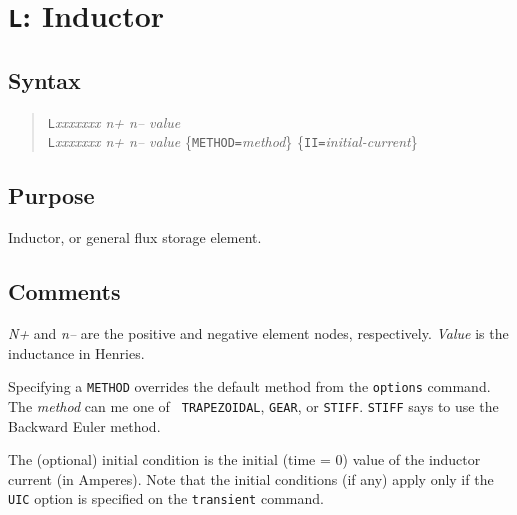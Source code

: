 \section{{\tt L}: Inductor}
\subsection{Syntax}
\begin{verse}
{\tt L}{\it xxxxxxx n+ n-- value}\\
{\tt L}{\it xxxxxxx n+ n-- value} \{{\tt METHOD=}{\it method}\} 
\{{\tt II=}{\it initial-current}\}
\end{verse}
\subsection{Purpose}

Inductor, or general flux storage element.
\subsection{Comments}

{\it N+} and {\it n--} are the positive and negative element nodes,
respectively.  {\it Value} is the inductance in Henries.

Specifying a {\tt METHOD} overrides the default method from the
{\tt options} command.  The {\it method} can me one of {\tt
TRAPEZOIDAL}, {\tt GEAR}, or {\tt STIFF}.  {\tt STIFF} says to use
the Backward Euler method.

The (optional) initial condition is the initial (time = 0) value of the
inductor current (in Amperes).  
Note that the initial conditions (if any)
apply only if the {\tt UIC} option is specified on the {\tt transient}
command.
